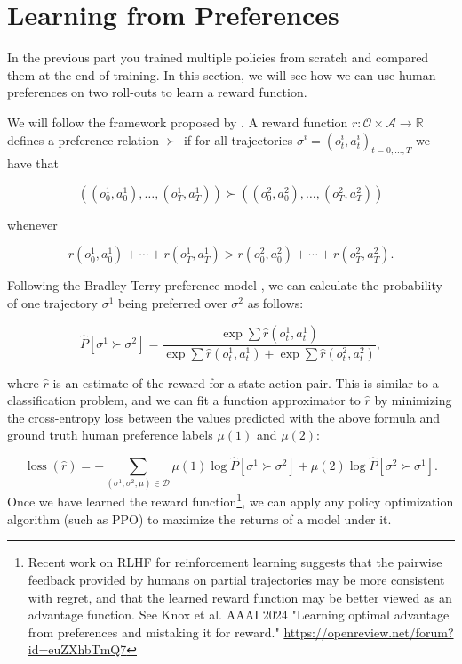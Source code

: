 \section{Learning from Preferences}

In the previous part you trained multiple policies from scratch and compared them at the end of training. In this section, we will see how we can use human preferences on two roll-outs to learn a reward function.

We will follow the framework proposed by \cite{NIPS2017_d5e2c0ad}. A reward function $r: \mathcal{O} \times \mathcal{A} \rightarrow \mathbb{R}$ defines a preference relation $\succ$ if for all trajectories $\sigma^i = (o^i_t,a^i_t)_{t=0,...,T}$ we have that

$$
\left(\left(o_0^1, a_0^1\right), \ldots,\left(o_{T}^1, a_{T}^1\right)\right) \succ\left(\left(o_0^2, a_0^2\right), \ldots,\left(o_{T}^2, a_{T}^2\right)\right)
$$

whenever

$$
r\left(o_0^1, a_0^1\right)+\cdots+r\left(o_{T}^1, a_{T}^1\right)>r\left(o_0^2, a_0^2\right)+\cdots+r\left(o_{T}^2, a_{T}^2\right) .
$$

Following the Bradley-Terry preference model \cite{19ff28b9-64f9-3656-ba40-08326a05748e}, we can calculate the probability of one trajectory $\sigma^1$ being preferred over $\sigma^2$ as follows:

$$
\hat{P}\left[\sigma^1 \succ \sigma^2\right]=\frac{\exp \sum \hat{r}\left(o_t^1, a_t^1\right)}{\exp \sum \hat{r}\left(o_t^1, a_t^1\right)+\exp \sum \hat{r}\left(o_t^2, a_t^2\right)},
$$

where $\hat{r}$ is an estimate of the reward for a state-action pair. This is similar to a classification problem, and we can fit a function approximator to $\hat{r}$ by minimizing the cross-entropy loss between the values predicted with the above formula and ground truth human preference labels $\mu(1)$ and $\mu(2)$:

$$
\operatorname{loss}(\hat{r})=-\sum_{\left(\sigma^1, \sigma^2, \mu\right) \in \mathcal{D}} \mu(1) \log \hat{P}\left[\sigma^1 \succ \sigma^2\right]+\mu(2) \log \hat{P}\left[\sigma^2 \succ \sigma^1\right] .
$$
%
Once we have learned the reward function\footnote{Recent work on RLHF for reinforcement learning suggests that the pairwise feedback provided by humans on partial trajectories may be more consistent with regret, and that the learned reward function may be better viewed as an advantage function. See Knox et al. AAAI 2024 "Learning optimal advantage from preferences and mistaking it for reward." \url{https://openreview.net/forum?id=euZXhbTmQ7}}, we can apply any policy optimization algorithm (such as PPO) to maximize the returns of a model under it.

